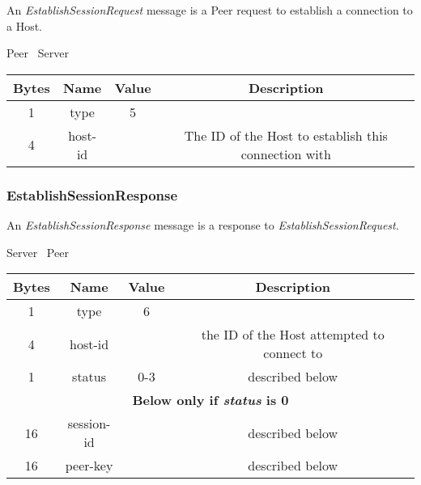\documentclass{article}
\begin{document}
    An \emph{EstablishSessionRequest} message is a Peer request to establish a connection to a Host.

    \begin{center}
        Peer \textrightarrow\ Server\\
        \begin{tabular}{|c|c|c|c|}
            \hline
            \textbf{Bytes} & \textbf{Name} & \textbf{Value} & \textbf{Description}                                 \\
            \hline
            1              & type          & 5              &                                                      \\
            \hline
            4              & host-id       &                & The ID of the Host to establish this connection with \\
            \hline
        \end{tabular}
    \end{center}

    \subsubsection{EstablishSessionResponse}

    An \emph{EstablishSessionResponse} message is a response to \emph{EstablishSessionRequest}.

    \begin{center}
        Server \textrightarrow\ Peer\\
        \begin{tabular}{|c|c|c|c|}
            \hline
            \textbf{Bytes} & \textbf{Name} & \textbf{Value} & \textbf{Description}                       \\
            \hline
            1              & type          & 6              &                                            \\
            \hline
            4              & host-id       &                & the ID of the Host attempted to connect to \\
            \hline
            1              & status        & 0-3            & described below                            \\
            \hline
            \multicolumn{4}{|c|}{\textbf{Below only if \emph{status} is 0} } \\
            \hline
            16             & session-id    &                & described below                            \\
            \hline
            16             & peer-key      &                & described below                            \\
            \hline
        \end{tabular}
    \end{center}
\end{document}
